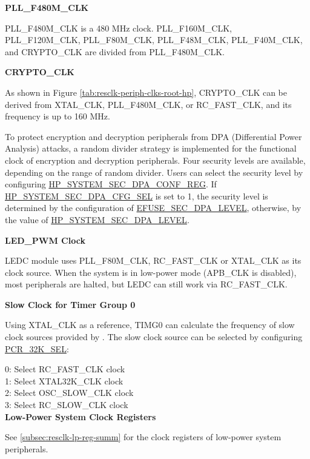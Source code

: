 \documentclass[main\_\_EN.tex]{subfiles}
\begin{document}
\begin{landscape}
\end{landscape}


\textbf{PLL\_F480M\_CLK}

PLL\_F480M\_CLK is a 480 MHz clock. PLL\_F160M\_CLK, PLL\_F120M\_CLK, PLL\_F80M\_CLK, PLL\_F48M\_CLK, PLL\_F40M\_CLK, and CRYPTO\_CLK are divided from PLL\_F480M\_CLK.

\textbf{CRYPTO\_CLK}

As shown in Figure \ref{tab:resclk-periph-clks-root-hp}, CRYPTO\_CLK can be derived from XTAL\_CLK, PLL\_F480M\_CLK, or RC\_FAST\_CLK, and its frequency is up to 160 MHz.


To protect encryption and decryption peripherals from DPA (Differential Power Analysis) attacks, a random divider strategy is implemented for the functional clock of encryption and decryption peripherals. Four security levels are available, depending on the range of random divider. Users can select the security level by configuring  \hyperref[regdesc:HPSYSTEMSECDPACONFREG]{HP\_SYSTEM\_SEC\_DPA\_CONF\_REG}. If  \hyperref[fielddesc:HPSYSTEMSECDPACFGSEL]{HP\_SYSTEM\_SEC\_DPA\_CFG\_SEL} is set to 1, the security level is determined by the configuration of \hyperref[fielddesc:EFUSESECDPALEVEL]{EFUSE\_SEC\_DPA\_LEVEL}, otherwise, by the value of  \hyperref[fielddesc:HPSYSTEMSECDPALEVEL]{HP\_SYSTEM\_SEC\_DPA\_LEVEL}.

\textbf{LED\_PWM Clock}

LEDC module uses PLL\_F80M\_CLK, RC\_FAST\_CLK or XTAL\_CLK as its clock source. When the system is in low-power mode (APB\_CLK is disabled), most peripherals are halted, but LEDC can still work via RC\_FAST\_CLK.

\textbf{Slow Clock for Timer Group 0}
\label{sec:pcr_peri_timg}

Using XTAL\_CLK as a reference, TIMG0 can calculate the frequency of slow clock sources provided by \chipname{}. The slow clock source can be selected by configuring \hyperref[fielddesc:PCR32KSEL]{PCR\_32K\_SEL}:

0: Select RC\_FAST\_CLK clock\\
1: Select XTAL32K\_CLK clock\\
2: Select OSC\_SLOW\_CLK clock\\
3: Select RC\_SLOW\_CLK clock\\


\textbf{Low-Power System Clock Registers}

See \ref{subsec:resclk-lp-reg-summ} \textit{} for the clock registers of low-power system peripherals.
\end{document}
